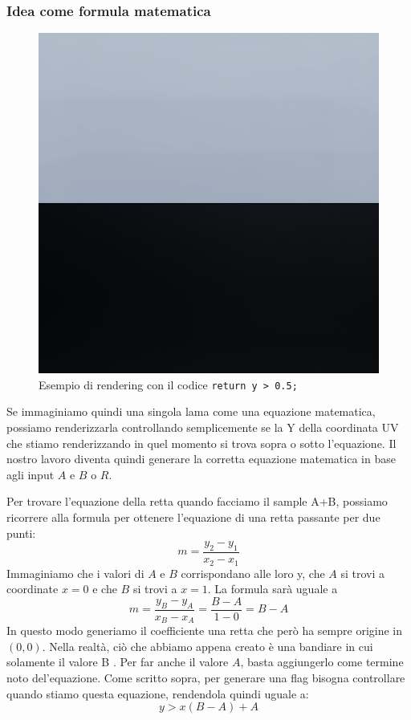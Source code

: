 \documentclass[main.tex]{subfiles}
\begin{document}
\subsubsection{Idea come formula matematica}\label{subsec:5_1_ShaperMath}
\begin{figure}
    \centering
    \captionsetup{justification=centering}
    \includegraphics[scale=0.35]{img/newFeatures/eqExample.jpg}
    \caption{Esempio di rendering con il codice \lstinline{return y > 0.5;}}
    \label{fig:5_eqExample}
\end{figure}
Se immaginiamo quindi una singola lama come una equazione matematica, possiamo renderizzarla controllando semplicemente se la Y della coordinata UV che stiamo renderizzando in quel momento si trova sopra o sotto l'equazione. Il nostro lavoro diventa quindi generare la corretta equazione matematica in base agli input $A$ e $B$ o $R$.

Per trovare l'equazione della retta quando facciamo il sample A+B, possiamo ricorrere alla formula per ottenere l'equazione di una retta passante per due punti:
\[m = \frac{y_2 - y_1}{x_2 - x_1}\]
Immaginiamo che i valori di $A$ e $B$ corrispondano alle loro y, che $A$ si trovi a coordinate $x = 0$ e che $B$ si trovi a $x = 1$. La formula sarà uguale a
\[m = \frac{y_B - y_A}{x_B - x_A} = \frac{B - A}{1 - 0} = B - A\]
In questo modo generiamo il coefficiente una retta che però ha sempre origine in $(0, 0)$. Nella realtà, ciò che abbiamo appena creato è una bandiare in cui solamente il valore B . Per far  anche il valore $A$, basta aggiungerlo come termine noto del'equazione. Come scritto sopra, per generare una flag bisogna controllare quando stiamo  questa equazione, rendendola quindi uguale a:
\[y > x(B - A) + A\]
\newline
\end{document}
